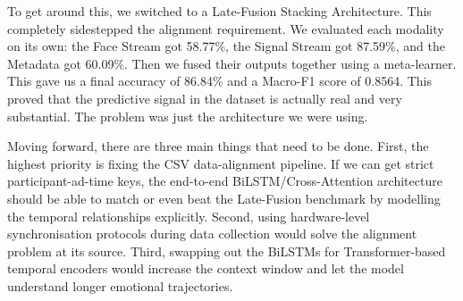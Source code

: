 \documentclass[12pt, a4paper]{article}
\begin{document}
To get around this, we switched to a Late-Fusion Stacking Architecture. This completely sidestepped the alignment requirement. We evaluated each modality on its own: the Face Stream got 58.77\%, the Signal Stream got 87.59\%, and the Metadata got 60.09\%. Then we fused their outputs together using a meta-learner. This gave us a final accuracy of 86.84\% and a Macro-F1 score of 0.8564. This proved that the predictive signal in the dataset is actually real and very substantial. The problem was just the architecture we were using.

Moving forward, there are three main things that need to be done. First, the highest priority is fixing the CSV data-alignment pipeline. If we can get strict participant-ad-time keys, the end-to-end BiLSTM/Cross-Attention architecture should be able to match or even beat the Late-Fusion benchmark by modelling the temporal relationships explicitly. Second, using hardware-level synchronisation protocols during data collection would solve the alignment problem at its source. Third, swapping out the BiLSTMs for Transformer-based temporal encoders would increase the context window and let the model understand longer emotional trajectories.
\end{document}
